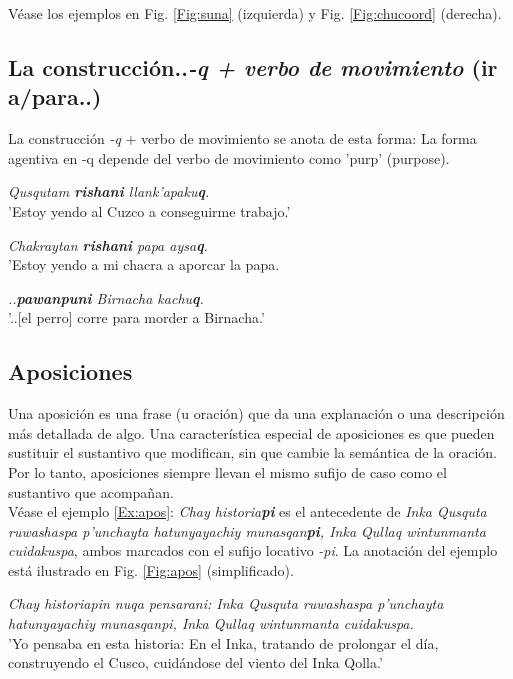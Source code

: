 \documentclass[a4paper,11pt,DIV12]{scrartcl}
\begin{document}
V\'ease los ejemplos en Fig. \ref{Fig:suna} (izquierda) y Fig. \ref{Fig:chucoord} (derecha).

\subsection{La construcci\'on..{\em -q + verbo de movimiento} (ir a/para..)}

La construcci\'on {\em -q} + verbo de movimiento se anota de esta forma: La forma agentiva en {-q} depende del verbo de movimiento como 'purp' (purpose).
\begin{examples}
 \item {\em Qusqutam \textbf{rishani} llank'apaku\textbf{q}.}\\
	'Estoy yendo al Cuzco a conseguirme trabajo.'
\item {\em Chakraytan \textbf{rishani} papa aysa\textbf{q}.}\\
      'Estoy yendo a mi chacra a aporcar la papa.
 	\hfill{\small \citep[209]{Cusi2}}
 \item {\em ..\textbf{pawanpuni} Birnacha kachu\textbf{q}.}\\
      '..[el perro] corre para morder a Birnacha.' \\
 	\hfill{\small \citep[91]{Dedenbach02}}
\end{examples}

\subsection{Aposiciones}
Una aposici\'on es una frase (u oraci\'on) que da una explanaci\'on o una descripci\'on m\'as detallada de algo. Una caracter\'istica especial de aposiciones es que pueden sustituir el sustantivo que modifican, sin que cambie la sem\'antica de la oraci\'on. Por lo tanto, aposiciones siempre llevan el mismo sufijo de caso como el sustantivo que acompa\~nan.\\
V\'ease el ejemplo \ref{Ex:apos}: {\em Chay historia\textbf{pi}} es el antecedente de {\em Inka Qusquta ruwashaspa p'unchayta hatunyayachiy munasqan\textbf{pi}, Inka Qullaq wintunmanta cuidakuspa}, ambos marcados con el sufijo locativo {\em -pi}. La anotaci\'on del ejemplo est\'a ilustrado en Fig. \ref{Fig:apos} (simplificado).


\begin{examples}
\item\label{Ex:apos} {\em Chay historiapin nuqa pensarani: Inka Qusquta ruwashaspa p'unchayta hatunyayachiy munasqanpi, Inka Qullaq wintunmanta cuidakuspa.}\\
      'Yo pensaba en esta historia: En el Inka, tratando de prolongar el día, construyendo el Cusco, cuidándose del viento del Inka Qolla.'\\
 	\hfill{\small \citep{Valderrama77}}
\end{examples}
\end{document}
